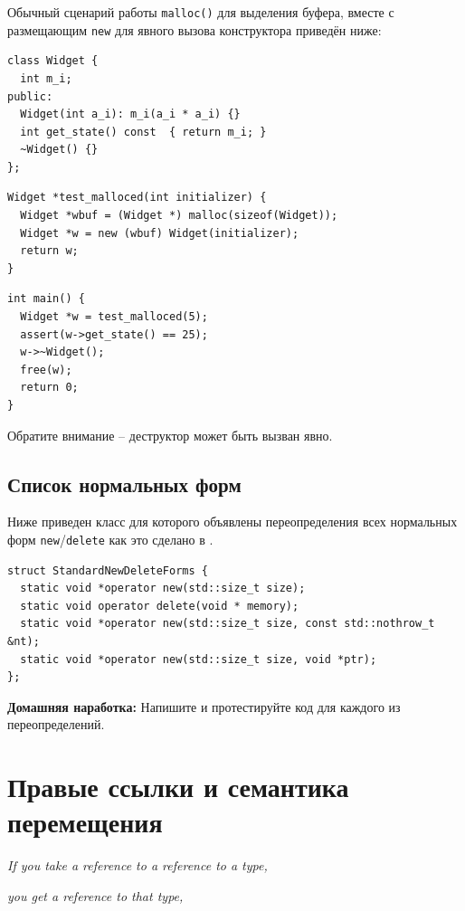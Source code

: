 \documentclass[a4paper,12pt,oneside]{book}
\begin{document}
Обычный сценарий работы \lstinline!malloc()! для выделения буфера, вместе с размещающим \lstinline!new! для явного вызова конструктора приведён ниже:

\begin{lstlisting}
class Widget {
  int m_i;
public:
  Widget(int a_i): m_i(a_i * a_i) {}
  int get_state() const  { return m_i; }
  ~Widget() {}
};
\end{lstlisting}

\begin{lstlisting}
Widget *test_malloced(int initializer) {
  Widget *wbuf = (Widget *) malloc(sizeof(Widget));
  Widget *w = new (wbuf) Widget(initializer);
  return w;
}
\end{lstlisting}

\begin{lstlisting}
int main() {
  Widget *w = test_malloced(5);
  assert(w->get_state() == 25);
  w->~Widget();
  free(w);
  return 0;
}
\end{lstlisting}

Обратите внимание -- деструктор может быть вызван явно.

\subsection{Список нормальных форм}\label{subsub:normalforms}

Ниже приведен класс для которого объявлены переопределения всех нормальных форм \lstinline!new!/\lstinline!delete! как это сделано в \cite{effcpp3d}.

\begin{lstlisting}
struct StandardNewDeleteForms {
  static void *operator new(std::size_t size);
  static void operator delete(void * memory);
  static void *operator new(std::size_t size, const std::nothrow_t &nt);
  static void *operator new(std::size_t size, void *ptr);
};
\end{lstlisting}

\textbf{Домашняя наработка:} Напишите и протестируйте код для каждого из переопределений.

\pagebreak
\section{Правые ссылки и семантика перемещения}

\hfill\textit{If you take a reference to a reference to a type,}

\hfill\textit{you get a reference to that type,}
\end{document}
